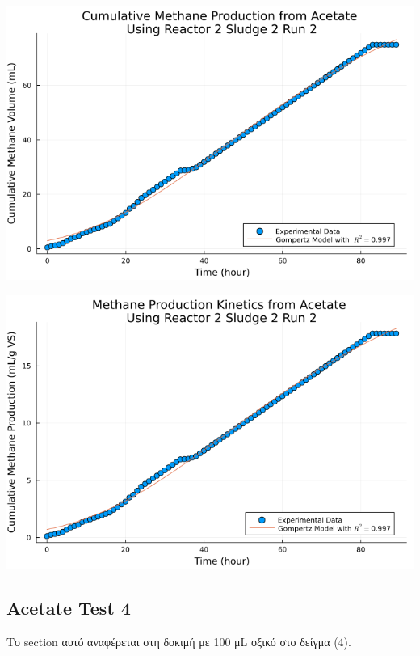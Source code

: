 \documentclass[11pt]{article}
\begin{document}
\begin{center}
\includegraphics[width=.9\linewidth]{../plots/BMPs/Acetate/methane_kinetics_acet_test_2_s2_2_hour.png}
\end{center}

\begin{center}
\includegraphics[width=.9\linewidth]{../plots/BMPs/Acetate/specific_methane_kinetics_acet_test_2_s2_2_hour.png}
\end{center}

\subsection{Acetate Test 4}
\label{sec:orgd6eb60e}
Το section αυτό αναφέρεται στη δοκιμή με 100 μL οξικό στο δείγμα (4).
\end{document}
